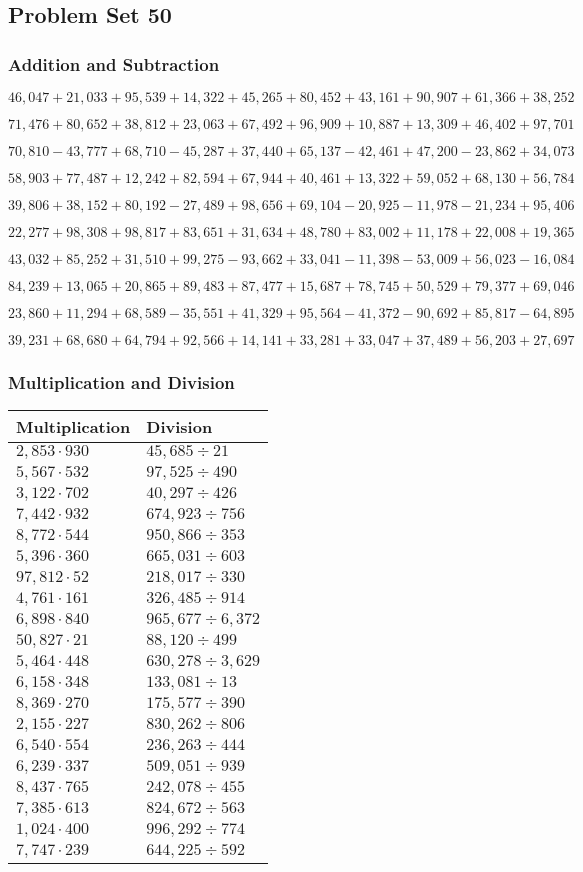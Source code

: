 \hypertarget{problem-set-50-3}{%
\subsection{Problem Set 50}\label{problem-set-50-3}}

\hypertarget{addition-and-subtraction-272}{%
\subsubsection{Addition and
Subtraction}\label{addition-and-subtraction-272}}

\(46,047+21,033+95,539+14,322+45,265+80,452+43,161+90,907+61,366+ 38,252\)

\(71,476+80,652+38,812+23,063+67,492+96,909+10,887+13,309+46,402+97,701\)

\(70,810-43,777+68,710-45,287+37,440+65,137-42,461+47,200-23,862+34,073\)

\(58,903+77,487+12,242+82,594+67,944+40,461+13,322+59,052+68,130+56,784\)

\(39,806+38,152+80,192-27,489+98,656+69,104-20,925-11,978-21,234+95,406\)

\(22,277+98,308+98,817+83,651+31,634+48,780+83,002+11,178+22,008+19,365\)

\(43,032+85,252+31,510+99,275-93,662+33,041-11,398-53,009+56,023-16,084\)

\(84,239+13,065+20,865+89,483+87,477+15,687+78,745+50,529+79,377+69,046\)

\(23,860+11,294+68,589-35,551+41,329+95,564-41,372-90,692+85,817-64,895\)

\(39,231+68,680+64,794+92,566+14,141+33,281+33,047+37,489+56,203+27,697\)

\hypertarget{multiplication-and-division-271}{%
\subsubsection{Multiplication and
Division}\label{multiplication-and-division-271}}

\begin{longtable}[]{@{}ll@{}}
\toprule
Multiplication & Division\tabularnewline
\midrule
\endhead
\(2,853\cdot930\) & \(45,685÷21\)\tabularnewline
\(5,567\cdot532\) & \(97,525÷490\)\tabularnewline
\(3,122\cdot702\) & \(40,297÷426\)\tabularnewline
\(7,442\cdot932\) & \(674,923÷756\)\tabularnewline
\(8,772\cdot544\) & \(950,866÷353\)\tabularnewline
\(5,396\cdot360\) & \(665,031÷603\)\tabularnewline
\(97,812\cdot52\) & \(218,017÷330\)\tabularnewline
\(4,761\cdot161\) & \(326,485÷914\)\tabularnewline
\(6,898\cdot840\) & \(965,677÷6,372\)\tabularnewline
\(50,827\cdot21\) & \(88,120÷499\)\tabularnewline
\(5,464\cdot448\) & \(630,278÷3,629\)\tabularnewline
\(6,158\cdot348\) & \(133,081÷13\)\tabularnewline
\(8,369\cdot270\) & \(175,577÷390\)\tabularnewline
\(2,155\cdot227\) & \(830,262÷806\)\tabularnewline
\(6,540\cdot554\) & \(236,263÷444\)\tabularnewline
\(6,239\cdot337\) & \(509,051÷939\)\tabularnewline
\(8,437\cdot765\) & \(242,078÷455\)\tabularnewline
\(7,385\cdot613\) & \(824,672÷563\)\tabularnewline
\(1,024\cdot400\) & \(996,292÷774\)\tabularnewline
\(7,747\cdot239\) & \(644,225÷592\)\tabularnewline
\bottomrule
\end{longtable}

